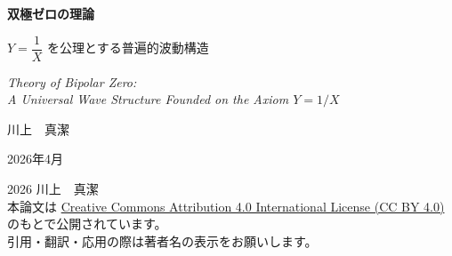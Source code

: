 \documentclass[12pt, a4paper]{article}
\theoremstyle{definition}
\newcommand{\Switch}{\Theta}
\begin{document}
\begin{titlepage}
  \centering
  \vspace*{3cm}

  {\Huge\bfseries\sffamily 双極ゼロの理論}

  \vspace{0.8cm}

  {\Large\sffamily\color{headerblue}
    $Y = \dfrac{1}{X}$ を公理とする普遍的波動構造}

  \vspace{1.2cm}

  {\large\itshape
    Theory of Bipolar Zero:\\[0.3em]
    A Universal Wave Structure Founded on the Axiom $Y = 1/X$}

  \vspace{3cm}

  {\large 川上　真潔}

  \vspace{0.5cm}

  {\normalsize 2026年4月}

  \vspace{1.5cm}

  \begin{small}
    \textcopyright{} 2026 川上　真潔\\[0.3em]
    本論文は
    \href{https://creativecommons.org/licenses/by/4.0/}{%
      Creative Commons Attribution 4.0 International License (CC BY 4.0)}
    のもとで公開されています。\\
    引用・翻訳・応用の際は著者名の表示をお願いします。
  \end{small}

  \vfill

  \begin{abstract}
    \noindent
    本論文は，$Y = 1/X$ という単一の数学的関係式を唯一の公理（公理零番）として採用し，
    そこから「双極ゼロ」の概念，波の必然的発生，球体モデルによる共振と減衰の分離，
    存在スイッチ関数 $\Switch(\mathbf{v})$ による連鎖作用，
    および理論の基底非依存的普遍性を演繹する体系的理論を提示する．

    本理論において「ゼロ」は単なる「無」ではない．
    $X \to 0$ における $Y \to \infty$（起源のゼロ）と，
    $X \to \infty$ における $Y \to 0$（平衡のゼロ）は，
    同一構造の両極として定義される．
    この双極性から，波の発生は選択ではなく数学的必然として導出される．

    閉じた系（球体内部 $S^-$）では共振のみが生じ，減衰は境界 $\partial S$
    の突破による外部との接触によってのみ可能となることを示す．
    また，ベクトルの大きさではなく「存在の有無」が次の作用の起動条件となる
    スイッチ関数 $\Switch(\mathbf{v})$ を定義し，
    異なる系をまたいだ連鎖作用の普遍的記述を可能にする．


\end{abstract}
\end{titlepage}
\end{document}
